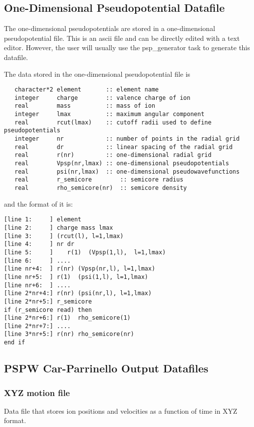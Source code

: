 \subsection{One-Dimensional Pseudopotential Datafile}
The one-dimensional pseudopotentials are stored in a one-dimensional 
pseudopotential file.  This is an ascii file and can be directly edited with
a text editor.  However, the user will usually use the psp\_generator
task to generate this datafile.

The data stored in the one-dimensional pseudopotential file is
\begin{verbatim}
   character*2 element       :: element name
   integer     charge        :: valence charge of ion
   real        mass          :: mass of ion
   integer     lmax          :: maximum angular component
   real        rcut(lmax)    :: cutoff radii used to define pseudopotentials
   integer     nr            :: number of points in the radial grid
   real        dr            :: linear spacing of the radial grid
   real        r(nr)         :: one-dimensional radial grid
   real        Vpsp(nr,lmax) :: one-dimensional pseudopotentials
   real        psi(nr,lmax)  :: one-dimensional pseudowavefunctions
   real        r_semicore        :: semicore radius
   real        rho_semicore(nr)  :: semicore density
\end{verbatim}
and the format of it is:
\begin{verbatim}
[line 1:     ] element  
[line 2:     ] charge mass lmax
[line 3:     ] (rcut(l), l=1,lmax)
[line 4:     ] nr dr
[line 5:     ]    r(1)  (Vpsp(1,l),  l=1,lmax)
[line 6:     ] ....
[line nr+4:  ] r(nr) (Vpsp(nr,l), l=1,lmax)
[line nr+5:  ] r(1)  (psi(1,l), l=1,lmax) 
[line nr+6:  ] ....
[line 2*nr+4:] r(nr) (psi(nr,l), l=1,lmax)
[line 2*nr+5:] r_semicore
if (r_semicore read) then
[line 2*nr+6:] r(1)  rho_semicore(1)
[line 2*nr+7:] ....
[line 3*nr+5:] r(nr) rho_semicore(nr)
end if
\end{verbatim}



\subsection{PSPW Car-Parrinello Output Datafiles}
\label{sec:pspw_cp_data}

\subsubsection{XYZ motion file}
Data file that stores ion positions and velocities as
a function of time in XYZ format.

